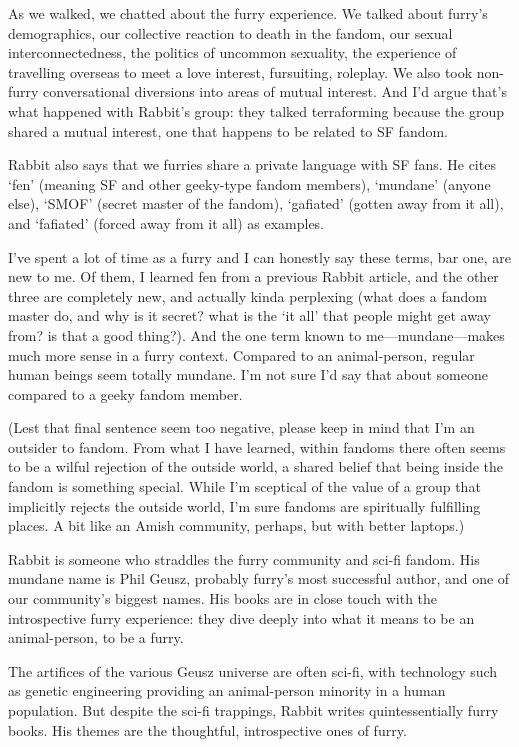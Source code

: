 As we walked, we chatted about the furry experience. We talked about furry's demographics, our collective reaction to death in the fandom, our sexual interconnectedness, the politics of uncommon sexuality, the experience of travelling overseas to meet a love interest, fursuiting, roleplay. We also took non-furry conversational diversions into areas of mutual interest. And I'd argue that's what happened with Rabbit's group: they talked terraforming because the group shared a mutual interest, one that happens to be related to SF fandom.

Rabbit also says that we furries share a private language with SF fans. He cites `fen' (meaning SF and other geeky-type fandom members), `mundane' (anyone else), `SMOF' (secret master of the fandom), `gafiated' (gotten away from it all), and `fafiated' (forced away from it all) as examples.

I've spent a lot of time as a furry and I can honestly say these terms, bar one, are new to me. Of them, I learned fen from a previous Rabbit article, and the other three are completely new, and actually kinda perplexing (what does a fandom master do, and why is it secret? what is the `it all' that people might get away from? is that a good thing?). And the one term known to me—mundane—makes much more sense in a furry context. Compared to an animal-person, regular human beings seem totally mundane. I'm not sure I'd say that about someone compared to a geeky fandom member.

(Lest that final sentence seem too negative, please keep in mind that I'm an outsider to fandom. From what I have learned, within fandoms there often seems to be a wilful rejection of the outside world, a shared belief that being inside the fandom is something special. While I'm sceptical of the value of a group that implicitly rejects the outside world, I'm sure fandoms are spiritually fulfilling places. A bit like an Amish community, perhaps, but with better laptops.)

Rabbit is someone who straddles the furry community and sci-fi fandom. His mundane name is Phil Geusz, probably furry's most successful author, and one of our community's biggest names. His books are in close touch with the introspective furry experience: they dive deeply into what it means to be an animal-person, to be a furry.

The artifices of the various Geusz universe are often sci-fi, with technology such as genetic engineering providing an animal-person minority in a human population. But despite the sci-fi trappings, Rabbit writes quintessentially furry books. His themes are the thoughtful, introspective ones of furry.

